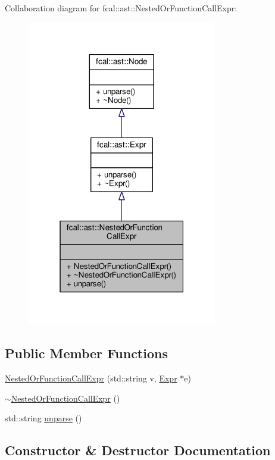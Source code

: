 Collaboration diagram for fcal\+:\+:ast\+:\+:Nested\+Or\+Function\+Call\+Expr\+:
\nopagebreak
\begin{figure}[H]
\begin{center}
\leavevmode
\includegraphics[width=235pt]{classfcal_1_1ast_1_1NestedOrFunctionCallExpr__coll__graph}
\end{center}
\end{figure}
\subsection*{Public Member Functions}
\begin{DoxyCompactItemize}
\item 
\hyperlink{classfcal_1_1ast_1_1NestedOrFunctionCallExpr_a4183cd1f5d8eddc33fb85c4d83272c7c}{Nested\+Or\+Function\+Call\+Expr} (std\+::string v, \hyperlink{classfcal_1_1ast_1_1Expr}{Expr} $\ast$e)
\item 
\hyperlink{classfcal_1_1ast_1_1NestedOrFunctionCallExpr_a9d1e5598fee427ce299f7a86cfcaaa9e}{$\sim$\+Nested\+Or\+Function\+Call\+Expr} ()
\item 
std\+::string \hyperlink{classfcal_1_1ast_1_1NestedOrFunctionCallExpr_aba7c47b3587c8d9e9c1d18e30f005c45}{unparse} ()
\end{DoxyCompactItemize}


\subsection{Constructor \& Destructor Documentation}
